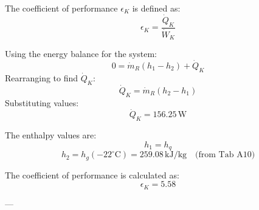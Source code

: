 The coefficient of performance \( \epsilon_K \) is defined as:  
\[
\epsilon_K = \frac{\dot{Q}_K}{\dot{W}_K}
\]  

Using the energy balance for the system:  
\[
0 = \dot{m}_R (h_1 - h_2) + \dot{Q}_K
\]  
Rearranging to find \( \dot{Q}_K \):  
\[
\dot{Q}_K = \dot{m}_R (h_2 - h_1)
\]  
Substituting values:  
\[
\dot{Q}_K = 156.25 \, \text{W}
\]  

The enthalpy values are:  
\[
h_1 = h_q
\]  
\[
h_2 = h_g(-22^\circ\text{C}) = 259.08 \, \text{kJ/kg} \quad \text{(from Tab A10)}
\]  

The coefficient of performance is calculated as:  
\[
\epsilon_K = 5.58
\]  

---